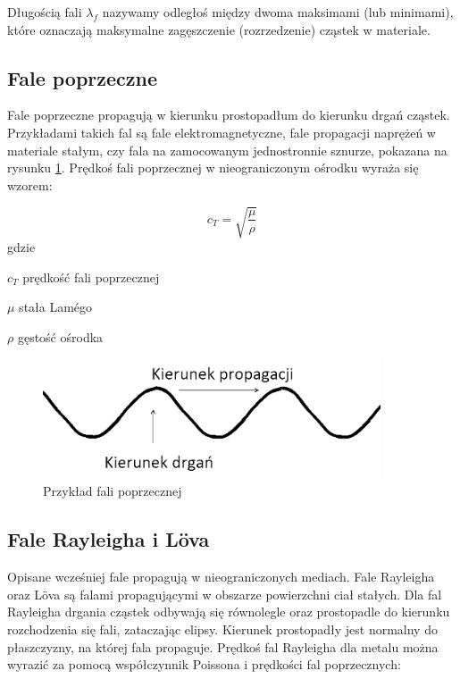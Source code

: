 Długością fali \( \lambda_f \) nazywamy odległoś między dwoma maksimami (lub minimami), które oznaczają maksymalne zagęszczenie (rozrzedzenie) cząstek w materiale.

\subsection{Fale poprzeczne}

Fale poprzeczne propagują w kierunku prostopadłum do kierunku drgań cząstek. Przykładami takich fal są fale elektromagnetyczne, fale propagacji naprężeń w materiale stałym, czy fala na zamocowanym jednostronnie sznurze, pokazana na rysunku \ref{fig:fala_poprzeczna}. Prędkoś fali poprzecznej w nieograniczonym ośrodku wyraża się wzorem:

\begin{equation}
c_T=\sqrt{\frac{\mu}{\rho}}
\end{equation}
gdzie
\begin{eqwhere}[2cm]
        \item[$c_T$] prędkość fali poprzecznej
        \item[$\mu$] stała Lam\'{e}go
        \item[$\rho$] gęstość ośrodka
\end{eqwhere}

\begin{figure}[h]
\centering
\includegraphics[width=10cm]{Zdjecia/2/fala_poprzeczna2}
\caption{Przykład fali poprzecznej}
\label{fig:fala_poprzeczna}
\end{figure}

\subsection{Fale Rayleigha i L\"{o}va}

Opisane wcześniej fale propagują w nieograniczonych mediach. Fale Rayleigha oraz L\"{o}va są falami propagującymi w obszarze powierzchni ciał stałych. Dla fal Rayleigha drgania cząstek odbywają się równolegle oraz prostopadle do kierunku rozchodzenia się fali, zataczając elipsy. Kierunek prostopadły jest normalny do płaszczyzny, na której fala propaguje. Prędkoś fal Rayleigha dla metalu można wyrazić za pomocą współczynnik Poissona i prędkości fal poprzecznych:

